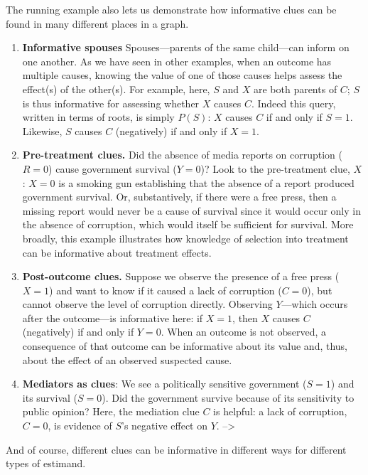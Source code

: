 \documentclass[12pt,]{book}
\begin{document}
The running example also lets us demonstrate how informative clues can be found in many different places in a graph.

\begin{enumerate}
\def\labelenumi{\arabic{enumi}.}
\item
  \textbf{Informative spouses} Spouses---parents of the same child---can inform on one another. As we have seen in other examples, when an outcome has multiple causes, knowing the value of one of those causes helps assess the effect(s) of the other(s). For example, here, \(S\) and \(X\) are both parents of \(C\); \(S\) is thus informative for assessing whether \(X\) causes \(C\). Indeed this query, written in terms of roots, is simply \(P(S)\): \(X\) causes \(C\) if and only if \(S=1\). Likewise, \(S\) causes \(C\) (negatively) if and only if \(X=1\).
\item
  \textbf{Pre-treatment clues.} Did the absence of media reports on corruption (\(R=0\)) cause government survival (\(Y=0\))? Look to the pre-treatment clue, \(X\): \(X=0\) is a smoking gun establishing that the absence of a report produced government survival. Or, substantively, if there were a free press, then a missing report would never be a cause of survival since it would occur only in the absence of corruption, which would itself be sufficient for survival. More broadly, this example illustrates how knowledge of selection into treatment can be informative about treatment effects.
\item
  \textbf{Post-outcome clues.} Suppose we observe the presence of a free press (\(X=1\)) and want to know if it caused a lack of corruption (\(C=0\)), but cannot observe the level of corruption directly. Observing \(Y\)---which occurs after the outcome---is informative here: if \(X=1\), then \(X\) causes \(C\) (negatively) if and only if \(Y=0\). When an outcome is not observed, a consequence of that outcome can be informative about its value and, thus, about the effect of an observed suspected cause.
\item
  \textbf{Mediators as clues}: We see a politically sensitive government (\(S=1\)) and its survival (\(S=0\)). Did the government survive because of its sensitivity to public opinion? Here, the mediation clue \(C\) is helpful: a lack of corruption, \(C=0\), is evidence of \(S\)'s negative effect on \(Y\). --\textgreater{}
\end{enumerate}

And of course, different clues can be informative in different ways for different types of estimand.
\end{document}
